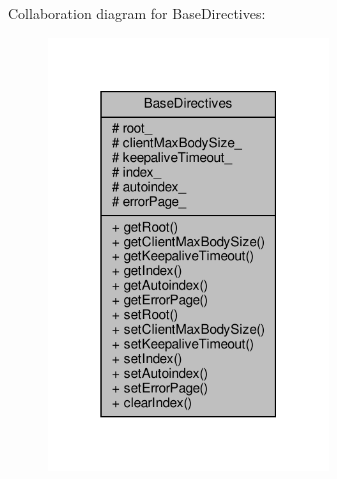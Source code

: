 Collaboration diagram for Base\+Directives\+:
\nopagebreak
\begin{figure}[H]
\begin{center}
\leavevmode
\includegraphics[width=211pt]{classft_1_1_base_directives__coll__graph}
\end{center}
\end{figure}
